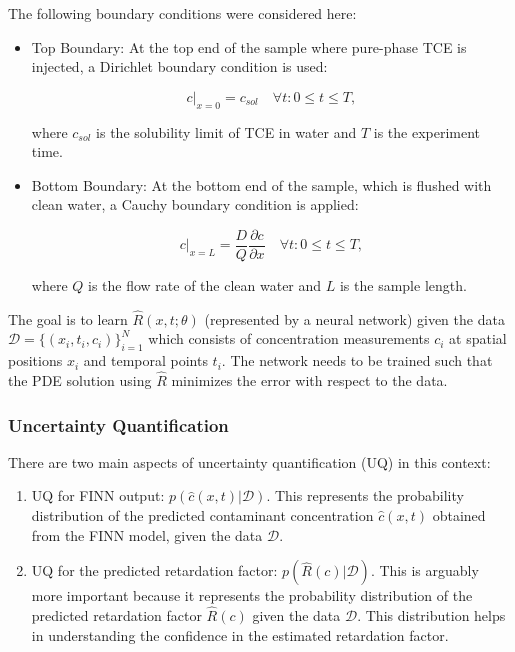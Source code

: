 The following boundary conditions were considered here:

\begin{itemize}
    \item Top Boundary: At the top end of the sample where pure-phase TCE is injected, a Dirichlet boundary condition is used:

    \begin{equation}
        c|_{x=0} = c_{sol} \quad \forall t : 0 \leq t \leq T,
    \end{equation}

    where $c_{sol}$ is the solubility limit of TCE in water and $T$ is the experiment time.

    \item Bottom Boundary: At the bottom end of the sample, which is flushed with clean water, a Cauchy boundary condition is applied:

    \begin{equation}
        c|_{x=L} = \frac{D}{Q} \frac{\partial c}{\partial x} \quad \forall t : 0 \leq t \leq T,
    \end{equation}

    where $Q$ is the flow rate of the clean water and $L$ is the sample length.
\end{itemize}

The goal is to learn $\hat{R}(x,t;\theta)$ (represented by a neural network) given the data $\mathcal{D} = \{ (x_i, t_i, c_i) \}_{i=1}^N$ which consists of concentration measurements $c_i$ at spatial positions $x_i$ and temporal points $t_i$. The network needs to be trained such that the PDE solution using $\hat{R}$ minimizes the error with respect to the data.

\subsubsection{Uncertainty Quantification}
There are two main aspects of uncertainty quantification (UQ) in this context:
\begin{enumerate}
    \item UQ for FINN output: $p(\hat{c}(x,t) | \mathcal{D})$. This represents the probability distribution of the predicted contaminant concentration $\hat{c}(x,t)$ obtained from the FINN model, given the data $\mathcal{D}$.
    \item UQ for the predicted retardation factor: $p(\hat{R}(c) | \mathcal{D})$. This is arguably more important because it represents the probability distribution of the predicted retardation factor $\hat{R}(c)$ given the data $\mathcal{D}$. This distribution helps in understanding the confidence in the estimated retardation factor.
\end{enumerate}


